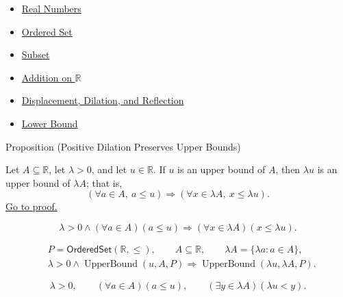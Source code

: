 \begin{dependencies}
\begin{itemize}
  \item \hyperref[def:reals]{Real Numbers}
  \item \hyperref[def:ordered-set]{Ordered Set}
  \item \hyperref[def:subset]{Subset}
  \item \hyperref[def:addition-on-r]{Addition on $\mathbb{R}$}
  \item \hyperref[def:displacement-dilation-reflection]{Displacement, Dilation, and Reflection}
  \item \hyperref[def:real-lower-bound]{Lower Bound}
\end{itemize}
\end{dependencies}

\begin{propositionbox}{Proposition (Positive Dilation Preserves Upper Bounds)}
\begin{proposition}
\label{prop:positive-dilation-preserves-upper-bounds}
Let $A\subseteq\mathbb{R}$, let $\lambda>0$, and let $u\in\mathbb{R}$.
If $u$ is an upper bound of $A$, then $\lambda u$ is an upper bound of
$\lambda A$; that is,
\[
\left(\forall a\in A,\ a\leq u\right)
\Longrightarrow
\left(\forall x\in\lambda A,\ x\leq \lambda u\right).
\]
\hyperref[prf:positive-dilation-preserves-upper-bounds]{Go to proof.}
\end{proposition}
\end{propositionbox}

\begin{remark*}
\[
\lambda>0\land(\forall a\in A)(a\leq u)
\Longrightarrow
(\forall x\in\lambda A)(x\leq\lambda u).
\]
\end{remark*}

\begin{remark*}
\[
\begin{aligned}
&P=\mathsf{OrderedSet}(\mathbb{R},\leq),\qquad
A\subseteq\mathbb{R},\qquad \lambda A=\{\lambda a:a\in A\},\\
&\lambda>0\land\operatorname{UpperBound}(u,A,P)
\Longrightarrow\operatorname{UpperBound}(\lambda u,\lambda A,P).
\end{aligned}
\]
\end{remark*}

\begin{remark*}
\[
\lambda>0,\qquad(\forall a\in A)(a\leq u),\qquad
(\exists y\in\lambda A)(\lambda u<y).
\]
\end{remark*}

